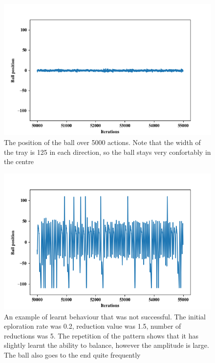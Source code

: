 \documentclass[12pt,a4paper]{article}
\begin{document}
\begin{figure}[H]
	\includegraphics{100_small}
	\caption{The position of the ball over 5000 actions. Note that the width of the tray is 125 in each direction, so the ball stays very confortably in the centre}
	\label{f1}
\end{figure}
\begin{figure}[H]
	\includegraphics{101_small}
	\caption{An example of learnt behaviour that was not successful. The initial eploration rate was 0.2, reduction value was 1.5, number of reductions was 5. The repetition of the pattern shows that it has slightly learnt the ability to balance, however the amplitude is large. The ball also goes to the end quite frequently}
	\label{f2}
\end{figure}
\end{document}
